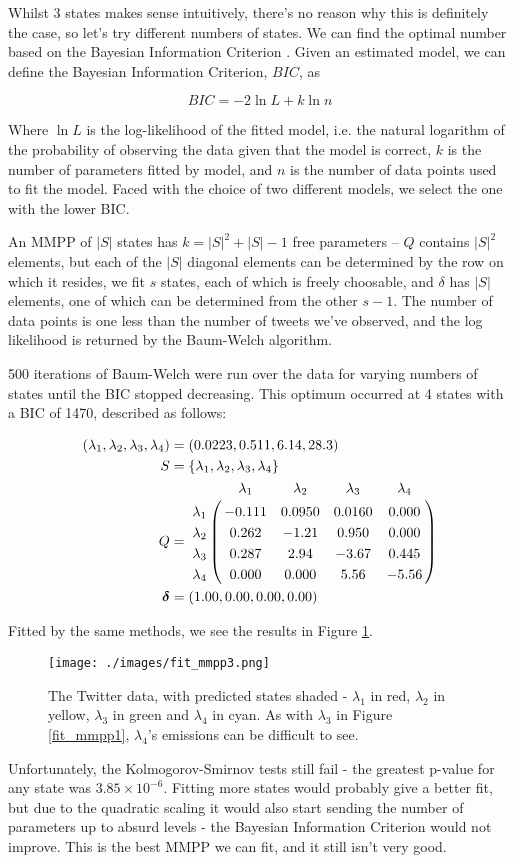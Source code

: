 Whilst 3 states makes sense intuitively, there's no reason why this is definitely the case, so let's try different numbers of states. We can find the optimal number based on the Bayesian Information Criterion \cite{bic}. Given an estimated model, we can define the Bayesian Information Criterion, $BIC$, as

$$
BIC = -2 \ln L + k \ln n
$$

Where $\ln L$ is the log-likelihood of the fitted model, i.e. the natural logarithm of the probability of observing the data given that the model is correct, $k$ is the number of parameters fitted by model, and $n$ is the number of data points used to fit the model. Faced with the choice of two different models, we select the one with the lower BIC.

An MMPP of $|S|$ states has $k=|S|^2+|S| -1$ free parameters -- $Q$ contains $|S|^2$ elements, but each of the $|S|$ diagonal elements can be determined by the row on which it resides, we fit $s$ states, each of which is freely choosable, and $\delta$ has $|S|$ elements, one of which can be determined from the other $s-1$. The number of data points is one less than the number of tweets we've observed, and the log likelihood is returned by the Baum-Welch algorithm.

500 iterations of Baum-Welch were run over the data for varying numbers of states until the BIC stopped decreasing. This optimum occurred at 4 states with a BIC of 1470, described as follows:

\begin{align*}
(\lambda_1,\lambda_2,\lambda_3,\lambda_4) &= (0.0223,0.511,6.14,28.3)\\
S &= \{\lambda_1,\lambda_2,\lambda_3,\lambda_4\}\\
Q &= \bordermatrix{      & \lambda_1 & \lambda_2 & \lambda_3 & \lambda_4\cr
                \lambda_1 & -0.111 & 0.0950 & 0.0160 & 0.000 \cr
                \lambda_2 & 0.262  & -1.21  & 0.950  & 0.000 \cr
                \lambda_3 & 0.287  & 2.94   & -3.67  & 0.445 \cr
                \lambda_4 & 0.000  & 0.000  & 5.56   & -5.56 \cr
			}\\
\bm{\delta} &= (1.00,0.00,0.00,0.00)
\end{align*}

Fitted by the same methods, we see the results in Figure \ref{fit_mmpp3}.
\begin{figure}[h!]
\centering
\texttt{[image: ./images/fit\_mmpp3.png]}
\caption{The Twitter data, with predicted states shaded - $\lambda_1$ in red, $\lambda_2$ in yellow, $\lambda_3$ in green and $\lambda_4$ in cyan. As with $\lambda_3$ in Figure \ref{fit_mmpp1}, $\lambda_4$'s emissions can be difficult to see.}
\label{fit_mmpp3}
\end{figure}
Unfortunately, the Kolmogorov-Smirnov tests still fail - the greatest p-value for any state was $3.85 \times 10^{-6}$. Fitting more states would probably give a better fit, but due to the quadratic scaling it would also start sending the number of parameters up to absurd levels - the Bayesian Information Criterion would not improve. This is the best MMPP we can fit, and it still isn't very good.

